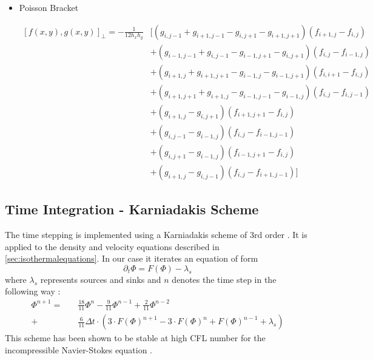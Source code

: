 \documentclass[master.tex]{subfiles}
\begin{document}
\begin{itemize}
\begin{footnotesize}
\end{footnotesize}      %
    \item Poisson Bracket \\
    \begin{footnotesize}
        \begin{equation}
            \begin{split}
                [f(x,y), g(x,y)]_\perp = -\frac{1}{12h_xh_y} & [
                    (g_{i, j-1} + g_{i+1,j-1} - g_{i, j+ 1} - g_{i+1,j+1})(f_{i+1,j}-f_{i, j}) \\
                    &+ (g_{i-1,j-1}+g_{i,j-1}-g_{i-1,j+1} - g_{i,j+1})(f_{i,j}-f_{i-1,j})\\
                    &+ (g_{i+1,j}+g_{i+1,j+1}-g_{i-1,j}-g_{i-1,j+1})(f_{i,i+1}-f_{i,j})\\
                    &+ (g_{i+1,j+1}+g_{i+1,j}-g_{i-1,j-1}-g_{i-1,j})(f_{i,j}-f_{i,j-1})\\
                    &+ (g_{i+1, j} - g_{i, j + 1})(f_{i+1,j+1}-f_{i,j})\\
                    &+ (g_{i, j-1} - g_{i-1, j})(f_{i,j}-f_{i-1,j-1})\\
                    &+ (g_{i,j+1}-g_{i-1,j})(f_{i-1,j+1}-f_{i,j})\\
                    &+ (g_{i+1, j} - g_{i,j-1})(f_{i,j}-f_{i+1,j-1}) ]
            \end{split}
        \end{equation}
    \end{footnotesize}


\end{itemize}

\subsection{Time Integration - Karniadakis Scheme}
The time stepping is implemented using a Karniadakis scheme of 3rd order \cite{KARNIADAKIS1991414}.
It is applied to the density and velocity equations described in \autoref{sec:isothermalequations}.
In our case it iterates an equation of form
\begin{equation}
    \partial_t \Phi = F(\Phi) - \lambda_s
\end{equation}
where $\lambda_s$ represents sources and sinks and $n$ denotes the time step in the following way :
\begin{equation}\label{eq:karnidakis-scheme}
\begin{split}
    \Phi^{n + 1} = \quad &\frac{18}{11} \Phi^{n} - \frac{9}{11} \Phi^{n-1} + \frac{2}{11}  \Phi^{n-2}\\
     + &\frac{6}{11}\Delta t \cdot (3 \cdot F(\Phi)^{n+1} - 3 \cdot F(\Phi)^{n} + F(\Phi)^{n-1} + \lambda_s)
\end{split}
\end{equation}
This scheme has been shown to be stable at high \ac{CFL} number for the incompressible Navier-Stokes equation \cite{KARNIADAKIS1991414}.
\end{document}

